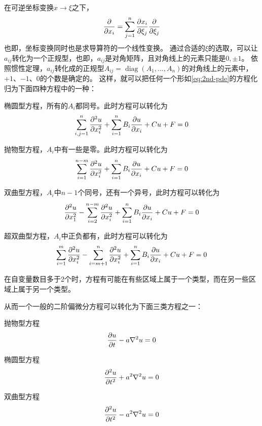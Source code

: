 \documentclass[UTF8]{ctexart}
\DeclareMathOperator{\diag}{diag}
\renewenvironment{itemize}{\begin{compactitem}}{\end{compactitem}}
\begin{document}
在可逆坐标变换$x \longrightarrow \xi$之下，
\[
    \pdv{x_i} = \sum_{j=1}^n \pdv{x_i}{\xi_j} \pdv{\xi_j}
\]
也即，坐标变换同时也是求导算符的一个线性变换。
通过合适的$\xi$的选取，可以让$a_{ij}$转化为一个正规型，也即，$a_{ij}$是对角矩阵，且对角线上的元素只能是$0, \pm 1$。
依照惯性定理，$a_{ij}$转化成的正规型$A_{ij}=\diag(A_1, \ldots, A_n)$的对角线上的元素中，$+1$、$-1$、$0$的个数是确定的。
这样，就可以把任何一个形如\eqref{eq:2nd-pde}的方程化归为下面四种方程中的一种：
\begin{itemize}
    \item 椭圆型方程，所有的$A_i$都同号。此时方程可以转化为
    \[
        \sum_{i,j=1}^n \pdv[2]{u}{x_i} + \sum_{i=1}^n B_i \pdv{u}{x_i} + Cu + F = 0
    \]
    \item 抛物型方程，$A_i$中有一些是零。此时方程可以转化为
    \[
        \sum_{i=1}^{n-m} \pdv[2]{u}{x_i} + \sum_{i=1}^n B_i \pdv{u}{x_i} + Cu + F = 0
    \]
    \item 双曲型方程，$A_i$中$n-1$个同号，还有一个异号，此时方程可以转化为
    \[
        \pdv[2]{u}{x_1} - \sum_{i=2}^{n-m} \pdv[2]{u}{x_i} + \sum_{i=1}^n B_i \pdv{u}{x_i} + Cu + F = 0
    \]
    \item 超双曲型方程，$A_i$中正负都有，此时方程可以转化为
    \[
        \sum_{i=1}^{m} \pdv[2]{u}{x_i} - \sum_{i=m+1}^{n} \pdv[2]{u}{x_i} + \sum_{i=1}^n B_i \pdv{u}{x_i} + Cu + F = 0
    \]
\end{itemize}

在自变量数目多于2个时，方程有可能在有些区域上属于一个类型，而在另一些区域上属于另一个类型。

从而一个一般的二阶偏微分方程可以转化为下面三类方程之一：
\begin{itemize}
    \item 抛物型方程
    \begin{equation}
        \pdv{u}{t} - a \laplacian u = 0
        \label{eq:parabolic-eq}
    \end{equation}
    \item 椭圆型方程
    \begin{equation}
        \pdv[2]{u}{t} + a^2 \laplacian u = 0
    \end{equation}
    \item 双曲型方程
    \begin{equation}
        \pdv[2]{u}{t} - a^2 \laplacian u = 0
    \end{equation}
\end{itemize}
\end{document}
